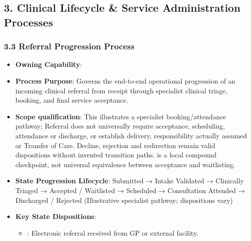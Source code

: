 \par\smallskip
{}\label{rad:processes:100}
\subsection*{3. Clinical Lifecycle \& Service Administration Processes}
\label{rad:processes:102}
\subsubsection*{3.3 Referral Progression Process}
\label{rad:processes:103}

\begin{itemize}

\item 
\textbf{Owning Capability}: \texttt{}



\item 
\textbf{Process Purpose}: Governs the end-to-end operational progression of an incoming clinical referral from receipt through specialist clinical triage, booking, and final service acceptance.



\item 
\textbf{Scope qualification}: This illustrates a specialist booking/\allowbreak{}attendance pathway; Referral does not universally require acceptance, scheduling, attendance or discharge, or establish delivery, responsibility actually assumed or Transfer of Care. Decline, rejection and redirection remain valid dispositions without invented transition paths. \texttt{} is a local compound checkpoint, not universal equivalence between acceptance and waitlisting.



\item 
\textbf{State Progression Lifecycle}: Submitted → Intake Validated → Clinically Triaged → Accepted /\allowbreak{} Waitlisted → Scheduled → Consultation Attended → Discharged /\allowbreak{} Rejected   (Illustrative specialist pathway; dispositions vary)



\item 
\textbf{Key State Dispositions}:


\begin{itemize}

\item 
\texttt{}: Electronic referral received from GP or external facility.




\end{itemize}
\end{itemize}
